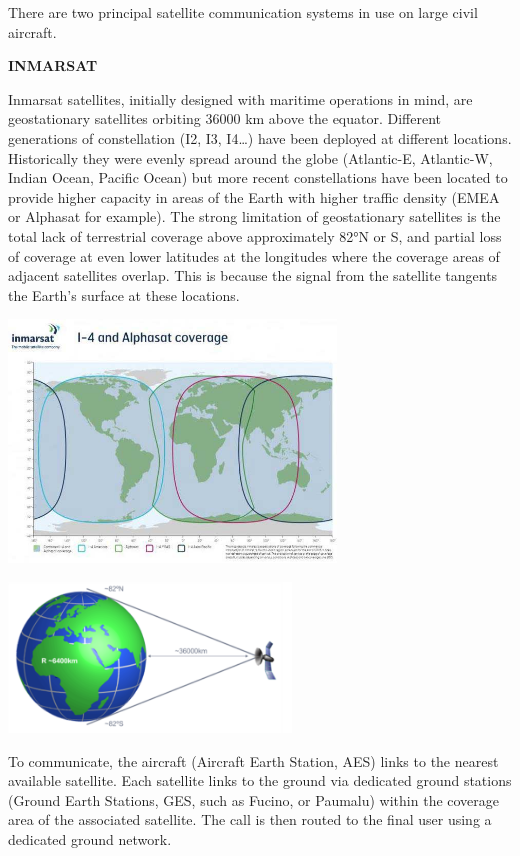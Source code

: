 \documentclass[
]{book}
\begin{document}
There are two principal satellite communication systems in use on large civil
aircraft.

\textbf{INMARSAT}

Inmarsat satellites, initially designed with maritime operations in mind, are
geostationary satellites orbiting 36000 km above the equator. Different
generations of constellation (I2, I3, I4\ldots) have been deployed at different
locations. Historically they were evenly spread around the globe (Atlantic-E,
Atlantic-W, Indian Ocean, Pacific Ocean) but more recent constellations have
been located to provide higher capacity in areas of the Earth with higher
traffic density (EMEA or Alphasat for example). The strong limitation of
geostationary satellites is the total lack of terrestrial coverage above
approximately 82°N or S, and partial loss of coverage at even lower latitudes
at the longitudes where the coverage areas of adjacent satellites overlap. This
is because the signal from the satellite tangents the Earth's surface at these
locations.

\includegraphics[width=3.42453in,height=2.53941in]{media/20/image7.jpeg}

\includegraphics[width=2.96181in,height=1.57569in]{media/20/image8.png}

To communicate, the aircraft (Aircraft Earth Station, AES) links to the nearest
available satellite. Each satellite links to the ground via dedicated ground
stations (Ground Earth Stations, GES, such as Fucino, or Paumalu) within the
coverage area of the associated satellite. The call is then routed to the final
user using a dedicated ground network.
\end{document}
